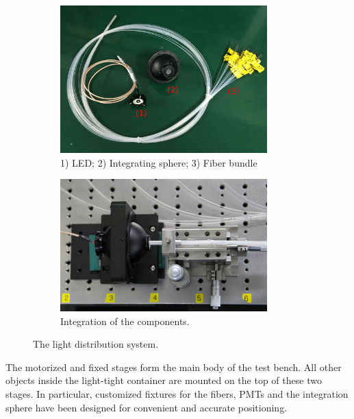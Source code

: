 \documentclass{nst}
\providecommand{\DIFadd}[1]{{\protect\color{yellow} \sf #1}} %
\providecommand{\DIFaddbegin}{} %
\providecommand{\DIFaddend}{} %
\providecommand{\DIFdelbegin}{} %
\providecommand{\DIFdelend}{} %
\begin{document}
\begin{figure}[!htb]

	\begin{subfigure}[t]{80mm}
		\includegraphics[width=80mm]{FIG3_a.jpg}
		\caption{1) LED; 2) Integrating sphere; 3) Fiber bundle}
		\label{fig:FIG3_a}
	\end{subfigure}
	\begin{subfigure}[t]{80mm}
		\includegraphics[width=80mm]{FIG3_b.jpg}
		\caption{Integration of the components.}
		\label{fig:FIG3_b}
	\end{subfigure}

	\caption{The light distribution system.}
	\label{fig:FIG3}
\end{figure}

The motorized and fixed stages form the main body of the test bench.
All other objects inside the light-tight container are mounted on the top of \DIFdelbegin \DIFdelend \DIFaddbegin \DIFadd{these two stages}\DIFaddend .
In particular, customized fixtures for the fibers, PMTs and the integration sphere have been designed for convenient and accurate positioning.

\end{document}

